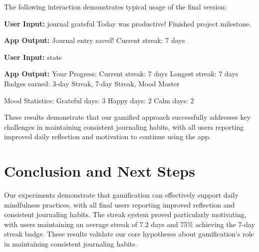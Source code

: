 \documentclass{article} %
\begin{document}
The following interaction demonstrates typical usage of the final version:

\begin{Userinput}
\textbf{User Input:} journal grateful Today was productive! Finished project milestone.
\end{Userinput}

\begin{Appoutput}
\textbf{App Output:} Journal entry saved! Current streak: 7 days
\end{Appoutput}

\begin{Userinput}
\textbf{User Input:} stats
\end{Userinput}

\begin{Appoutput}
\textbf{App Output:} Your Progress:
Current streak: 7 days
Longest streak: 7 days
Badges earned: 3-day Streak, 7-day Streak, Mood Master

Mood Statistics:
Grateful days: 3
Happy days: 2
Calm days: 2
\end{Appoutput}

These results demonstrate that our gamified approach successfully addresses key challenges in maintaining consistent journaling habits, with all users reporting improved daily reflection and motivation to continue using the app.




  

\section{Conclusion and Next Steps}
\label{sec:conclusion}

Our experiments demonstrate that gamification can effectively support daily mindfulness practices, with all final users reporting improved reflection and consistent journaling habits. The streak system proved particularly motivating, with users maintaining an average streak of 7.2 days and 75\% achieving the 7-day streak badge. These results validate our core hypotheses about gamification's role in maintaining consistent journaling habits.
\end{document}
